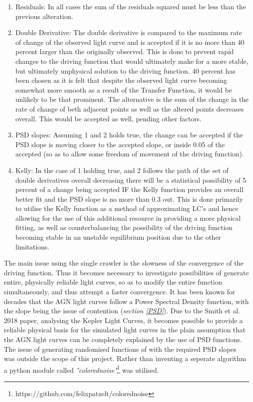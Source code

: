 \documentclass[a4paper, 12pt, twoside]{article}
\begin{document}
\begin{enumerate}
\item Residuals: In all cases the sum of the residuals squared must be less than the previous alteration.
\item Double Derivative: The double derivative is compared to the maximum rate of change of the observed light curve and is accepted if it is no more than 40 percent larger than the originally observed. This is done to prevent rapid changes to the driving function that would ultimately make for a more stable, but ultimately unphysical solution to the driving function. 40 percent has been chosen as it is felt that despite the observed light curve becoming somewhat more smooth as a result of the Transfer Function, it would be unlikely to be that prominent. The alternative is the sum of the change in the rate of change of beth adjacent points as well as the altered points decreases overall. This would be accepted as well, pending other factors.
\item PSD slopes: Assuming 1 and 2 holds true, the change can be accepted if the PSD slope is moving closer to the accepted slope, or inside 0.05 of the accepted (so as to allow some freedom of movement of the driving function).
\item Kelly: In the case of 1 holding true, and 2 follows the path of the set of double derivatives overall decreasing there will be a statistical possibility of 5 percent of a change being accepted IF the Kelly function provides an overall better fit and the PSD slope is no more than 0.3 out. This is done primarily to utilise the Kelly function as a method of approximating LC's and hence allowing for the use of this additional resource in providing a more physical fitting, as well as counterbalancing the possibility of the driving function becoming stable in an unstable equilibrium position due to the other limitations.
\end{enumerate}
The main issue using the single crawler is the slowness of the convergence of the driving function. Thus it becomes necessary to investigate possibilities of generate entire, physically reliable light curves, so as to modify the entire function simultaneously, and thus attempt a faster convergence. It has been known for decades that the AGN light curves follow a Power Spectral Density function, with the slope being the issue of contention (\emph{section \ref{PSD}}). Due to the Smith et al. 2018 paper, analysing the Kepler Light Curves, it becomes possible to provide a reliable physical basis for the simulated light curves in the plain assumption that the AGN light curves can be completely explained by the use of PSD functions. The issue of generating randomised functions of with the required PSD slopes was outside the scope of this project. Rather than inventing a seperate algorithm a python module called \emph{"colorednoise"}\footnote{https://github.com/felixpatzelt/colorednoise} was utilised. \\
\end{document}
